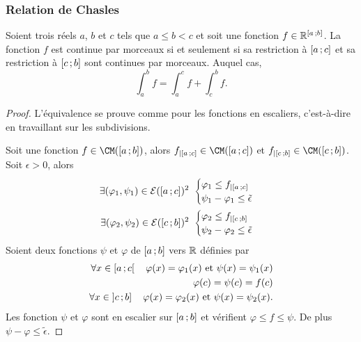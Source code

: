 \subsubsection{Relation de Chasles}

\begin{theo}
  Soient trois réels $a$, $b$ et $c$ tels que $a \leq b<c$ et soit une fonction $f \in \mathbb{R}^{\left[ a \, ;  b \right]}$. La fonction $f$ est continue par morceaux si et seulement si sa restriction à $\left[ a \, ;  c \right]$ et sa restriction à $\left[ c \, ;  b \right]$ sont continues par morceaux. Auquel cas,
  \begin{equation}
    \int_a^b f = \int_a^c f +\int_c^b f.
  \end{equation}
\end{theo}
\begin{proof}
  L'équivalence se prouve comme pour les fonctions en escaliers, c'est-à-dire en travaillant sur les subdivisions.

  Soit une fonction $f \in \CM(\intervalleff{a}{b})$, alors $f_{|\intervalleff{a}{c}} \in \CM(\intervalleff{a}{c})$ et $f_{|\intervalleff{c}{b}} \in \CM(\intervalleff{c}{b})$. Soit $\epsilon>0$, alors
  \begin{align}
    \exists (\varphi_1, \psi_1) \in \E(\intervalleff{a}{c})^2 \ \begin{cases} \varphi_1 \leq f_{|\intervalleff{a}{c}} \\ \psi_1 - \varphi_1 \leq \tilde{\epsilon} \end{cases} \\
\exists (\varphi_2, \psi_2) \in \E(\intervalleff{c}{b})^2 \ \begin{cases} \varphi_2 \leq f_{|\intervalleff{c}{b}} \\ \psi_2- \varphi_2 \leq \tilde{\epsilon} \end{cases}
  \end{align}
  Soient deux fonctions $\psi$ et $\varphi$ de $\left[ a \, ;  b \right]$ vers $\mathbb{R}$ définies par
  \begin{align}
    \forall x \in \left[ a \, ;  c \right[ \quad \varphi(x)=\varphi_1(x) \text{~et~} \psi(x)=\psi_1(x) \\
    \varphi(c)=\psi(c)=f(c) \\
    \forall x \in \left] c \, ;  b \right] \quad \varphi(x)=\varphi_2(x) \text{~et~} \psi(x)=\psi_2(x).
  \end{align}
  Les fonction $\psi$ et $\varphi$ sont en escalier sur $\left[ a \, ;  b \right]$ et vérifient $\varphi \leq f \leq \psi$. De plus $\psi-\varphi \leq \tilde{\epsilon}$.


\end{proof}
